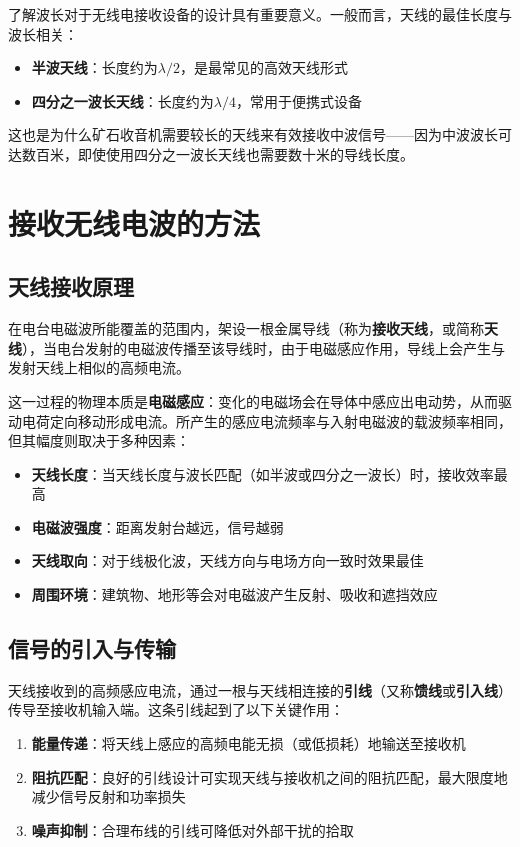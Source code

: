 \documentclass[12pt,UTF8]{ctexbook}
\begin{document}
了解波长对于无线电接收设备的设计具有重要意义。一般而言，天线的最佳长度与波长相关：

\begin{itemize}
	\item \textbf{半波天线}：长度约为$\lambda/2$，是最常见的高效天线形式
	\item \textbf{四分之一波长天线}：长度约为$\lambda/4$，常用于便携式设备
\end{itemize}

这也是为什么矿石收音机需要较长的天线来有效接收中波信号——因为中波波长可达数百米，即使使用四分之一波长天线也需要数十米的导线长度。

\section{接收无线电波的方法}

\subsection{天线接收原理}

在电台电磁波所能覆盖的范围内，架设一根金属导线（称为\textbf{接收天线}，或简称\textbf{天线}），当电台发射的电磁波传播至该导线时，由于电磁感应作用，导线上会产生与发射天线上相似的高频电流。

这一过程的物理本质是\textbf{电磁感应}：变化的电磁场会在导体中感应出电动势，从而驱动电荷定向移动形成电流。所产生的感应电流频率与入射电磁波的载波频率相同，但其幅度则取决于多种因素：

\begin{itemize}
	\item \textbf{天线长度}：当天线长度与波长匹配（如半波或四分之一波长）时，接收效率最高
	\item \textbf{电磁波强度}：距离发射台越远，信号越弱
	\item \textbf{天线取向}：对于线极化波，天线方向与电场方向一致时效果最佳
	\item \textbf{周围环境}：建筑物、地形等会对电磁波产生反射、吸收和遮挡效应
\end{itemize}

\subsection{信号的引入与传输}

天线接收到的高频感应电流，通过一根与天线相连接的\textbf{引线}（又称\textbf{馈线}或\textbf{引入线}）传导至接收机输入端。这条引线起到了以下关键作用：

\begin{enumerate}
	\item \textbf{能量传递}：将天线上感应的高频电能无损（或低损耗）地输送至接收机
	\item \textbf{阻抗匹配}：良好的引线设计可实现天线与接收机之间的阻抗匹配，最大限度地减少信号反射和功率损失
	\item \textbf{噪声抑制}：合理布线的引线可降低对外部干扰的拾取
\end{enumerate}
\end{document}
